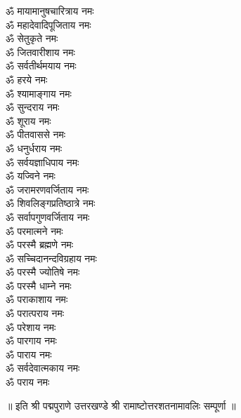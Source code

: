 \begin{multicols}{2}
\begin{flushleft}
ॐ मायामानुषचारित्राय नमः\\
ॐ महादेवादिपूजिताय नमः\\
ॐ सेतुकृते नमः\\
ॐ जितवारीशाय नमः\\
ॐ सर्वतीर्थमयाय नमः\\
ॐ हरये नमः\\
ॐ श्यामाङ्गाय नमः\\
ॐ सुन्दराय नमः\\
ॐ शूराय नमः\\
ॐ पीतवाससे नमः\hfill{}\\
ॐ धनुर्धराय नमः\\
ॐ सर्वयज्ञाधिपाय नमः\\
ॐ यज्विने नमः\\
ॐ जरामरणवर्जिताय नमः\\
ॐ शिवलिङ्गप्रतिष्ठात्रे नमः\\
ॐ सर्वापगुणवर्जिताय नमः\\
ॐ परमात्मने नमः\\
ॐ परस्मै ब्रह्मणे नमः\\
ॐ सच्चिदानन्दविग्रहाय नमः\\
ॐ परस्मै ज्योतिषे नमः\hfill{}\\
ॐ परस्मै धाम्ने नमः\\
ॐ पराकाशाय नमः\\
ॐ परात्पराय नमः\\
ॐ परेशाय नमः\\
ॐ पारगाय नमः\\
ॐ पाराय नमः\\
ॐ सर्वदेवात्मकाय नमः\\
ॐ पराय नमः\\
\end{flushleft}
\end{multicols}
\centerline{॥ इति श्री पद्मपुराणे उत्तरखण्डे श्री रामाष्टोत्तरशतनामावलिः सम्पूर्णा ॥}

